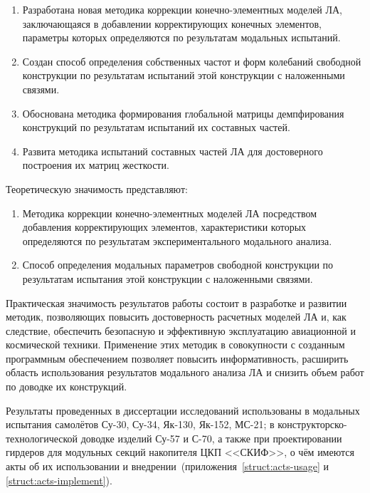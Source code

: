 {\novelty}
\begin{enumerate}[beginpenalty = 10000] 
	\item Разработана новая методика коррекции конечно-элементных моделей ЛА, заключающаяся в добавлении корректирующих конечных элементов, параметры которых определяются по результатам модальных испытаний.
	\item Создан способ определения собственных частот и форм колебаний свободной конструкции по результатам испытаний этой конструкции с наложенными связями.
	\item Обоснована методика формирования глобальной матрицы демпфирования конструкций по результатам испытаний их составных частей.
	\item Развита методика испытаний составных частей ЛА для достоверного построения их матриц жесткости.
\end{enumerate}

{\influence}

Теоретическую значимость представляют:

\begin{enumerate}[beginpenalty = 10000] 
	\item Методика коррекции конечно-элементных моделей ЛА посредством добавления корректирующих элементов, характеристики которых определяются по результатам экспериментального модального анализа.
	\item Способ определения модальных параметров свободной конструкции по результатам испытания этой конструкции с наложенными связями. 
\end{enumerate}

Практическая значимость результатов работы состоит в разработке и развитии методик, позволяющих повысить достоверность расчетных моделей ЛА и, как следствие, обеспечить безопасную и эффективную эксплуатацию авиационной и космической техники. Применение этих методик в совокупности с созданным программным обеспечением позволяет повысить информативность, расширить область использования результатов модального анализа ЛА и снизить объем работ по доводке их конструкций.

Результаты проведенных в диссертации исследований использованы в модальных испытания самолётов \mbox{Су-30}, \mbox{Су-34}, \mbox{Як-130}, \mbox{Як-152}, \mbox{МС-21}; в конструкторско-технологической доводке изделий \mbox{Су-57} и \mbox{С-70}, а также при проектировании  гирдеров для модульных секций накопителя ЦКП <<СКИФ>>, о чём имеются акты об их использовании и внедрении~(приложения~\ref{struct:acts-usage} и \ref{struct:acts-implement}).

